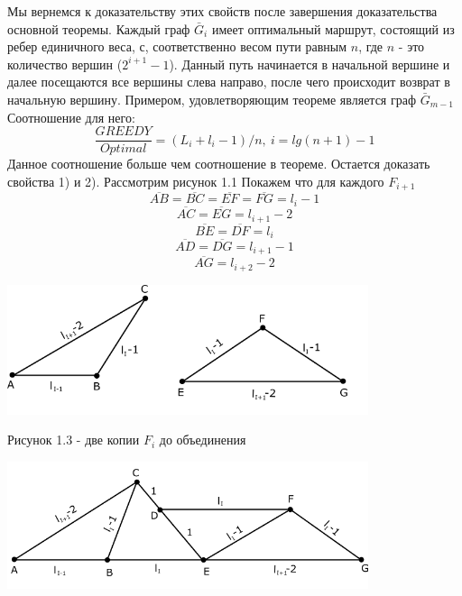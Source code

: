 \documentclass[a4paper, 14pt]{extarticle}
\numberwithin{equation}{section}
\begin{document}
Мы вернемся к доказательству этих свойств после завершения доказательства основной теоремы.
Каждый граф $\bar G_i$ имеет оптимальный маршрут, состоящий из ребер единичного веса, с, соответственно весом пути равным $n$, где $n$ - это количество вершин ($2^{i+1}-1$). Данный путь начинается в начальной вершине и далее посещаются все вершины слева направо, после чего происходит возврат в начальную вершину. Примером, удовлетворяющим теореме является граф $\bar G_{m-1}$ Соотношение для него:
\begin{equation}
\frac{GREEDY}{Optimal} = (L_i+l_i-1)/n, \:  i=lg(n+1)-1
\end{equation}
Данное соотношение больше чем соотношение в теореме.
Остается доказать свойства 1) и 2).
Рассмотрим рисунок 1.1
Покажем что для каждого $F_{i+1}$
\begin{equation}\label{2.13}
\overline {AB}= \overline {BC}= \overline {EF}=\overline {FG}=l_i-1
\end{equation}
\begin{equation}\label{2.14}
\overline {AC}= \overline {EG}=l_{i+1}-2
\end{equation}
\begin{equation}\label{2.15}
\overline {BE}= \overline {DF}=l_i
\end{equation}
\begin{equation}\label{2.16}
\overline {AD}= \overline {DG}=l_{i+1}-1
\end{equation}
\begin{equation}\label{2.17}
\overline {AG}=l_{i+2}-2
\end{equation}

\begin{center}
\includegraphics[width=300pt]{ris3.png}
\end{center}

\begin{center}
Рисунок 1.3 - две копии $F_i$ до объединения
\end{center}

\begin{center}
\includegraphics[width=300pt]{ris4.png}
\end{center}
\end{document}
